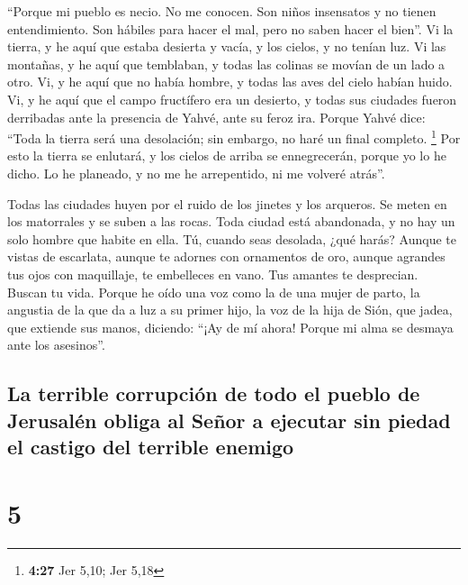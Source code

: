  ``Porque mi pueblo es necio. No me conocen. Son niños
insensatos y no tienen entendimiento. Son hábiles para hacer el mal,
pero no saben hacer el bien''.  Vi la tierra, y he aquí
que estaba desierta y vacía, y los cielos, y no tenían luz.
 Vi las montañas, y he aquí que temblaban, y todas las
colinas se movían de un lado a otro.  Vi, y he aquí que
no había hombre, y todas las aves del cielo habían huido.
 Vi, y he aquí que el campo fructífero era un desierto, y
todas sus ciudades fueron derribadas ante la presencia de Yahvé, ante su
feroz ira.  Porque Yahvé dice: ``Toda la tierra será una
desolación; sin embargo, no haré un final completo. \footnote{\textbf{4:27}
  Jer 5,10; Jer 5,18}  Por esto la tierra se enlutará, y
los cielos de arriba se ennegrecerán, porque yo lo he dicho. Lo he
planeado, y no me he arrepentido, ni me volveré atrás''.

 Todas las ciudades huyen por el ruido de los jinetes y
los arqueros. Se meten en los matorrales y se suben a las rocas. Toda
ciudad está abandonada, y no hay un solo hombre que habite en ella.
 Tú, cuando seas desolada, ¿qué harás? Aunque te vistas
de escarlata, aunque te adornes con ornamentos de oro, aunque agrandes
tus ojos con maquillaje, te embelleces en vano. Tus amantes te
desprecian. Buscan tu vida.  Porque he oído una voz como
la de una mujer de parto, la angustia de la que da a luz a su primer
hijo, la voz de la hija de Sión, que jadea, que extiende sus manos,
diciendo: ``¡Ay de mí ahora! Porque mi alma se desmaya ante los
asesinos''.

\hypertarget{la-terrible-corrupciuxf3n-de-todo-el-pueblo-de-jerusaluxe9n-obliga-al-seuxf1or-a-ejecutar-sin-piedad-el-castigo-del-terrible-enemigo}{%
\subsection{La terrible corrupción de todo el pueblo de Jerusalén obliga
al Señor a ejecutar sin piedad el castigo del terrible
enemigo}\label{la-terrible-corrupciuxf3n-de-todo-el-pueblo-de-jerusaluxe9n-obliga-al-seuxf1or-a-ejecutar-sin-piedad-el-castigo-del-terrible-enemigo}}

\hypertarget{section-4}{%
\section{5}\label{section-4}}

